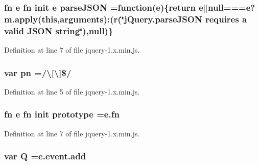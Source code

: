 \subsubsection[{\texorpdfstring{parse\+J\+S\+ON}{parseJSON}}]{ {\bf fn} {\bf e} {\bf fn} {\bf init} {\bf e} parse\+J\+S\+ON =function({\bf e})\{return {\bf e}$\vert$$\vert${\bf null}==={\bf e}?m.\+apply({\bf this},arguments)\+:(r(\char`\"{}j\+Query.\+parse\+J\+S\+ON requires {\bf a} valid J\+S\+ON string\char`\"{}),null)\}}\hypertarget{jquery-1_8x_8min_8js_a78744aa01b6245cc7f2a7fedfe14a390}{}\label{jquery-1_8x_8min_8js_a78744aa01b6245cc7f2a7fedfe14a390}


Definition at line 7 of file jquery-\/1.\+x.\+min.\+js.

\subsubsection[{\texorpdfstring{pn}{pn}}]{\setlength{\rightskip}{0pt plus 5cm}var pn =/\textbackslash{}\mbox{[}\textbackslash{}\mbox{]}\$/}\hypertarget{jquery-1_8x_8min_8js_a6a40831f7c967a457dbbd3b5e6f287d7}{}\label{jquery-1_8x_8min_8js_a6a40831f7c967a457dbbd3b5e6f287d7}


Definition at line 5 of file jquery-\/1.\+x.\+min.\+js.

\subsubsection[{\texorpdfstring{prototype}{prototype}}]{ {\bf fn} {\bf e} {\bf fn} {\bf init} prototype ={\bf e.\+fn}}\hypertarget{jquery-1_8x_8min_8js_a58b9d909b30dda5f8f279e559872ab72}{}\label{jquery-1_8x_8min_8js_a58b9d909b30dda5f8f279e559872ab72}


Definition at line 7 of file jquery-\/1.\+x.\+min.\+js.

\subsubsection[{\texorpdfstring{Q}{Q}}]{\setlength{\rightskip}{0pt plus 5cm}var Q ={\bf e.\+event.\+add}}\hypertarget{jquery-1_8x_8min_8js_a044ff3ae9eca11d4603780243cdfc911}{}\label{jquery-1_8x_8min_8js_a044ff3ae9eca11d4603780243cdfc911}


